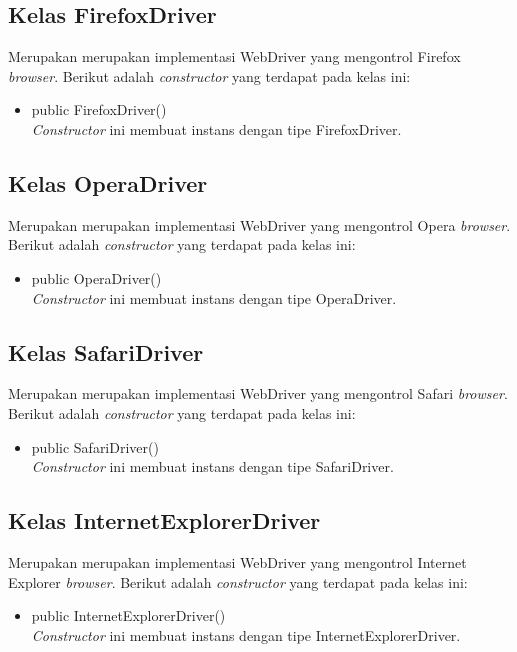 \subsection{Kelas FirefoxDriver}
\label{subsec:firefoxdriver}
Merupakan merupakan implementasi WebDriver yang mengontrol Firefox \textit{browser}. Berikut adalah \textit{constructor} yang terdapat pada kelas ini:
\begin{itemize}
\item public FirefoxDriver()\\
\textit{Constructor} ini membuat instans dengan tipe FirefoxDriver.
\end{itemize}

\subsection{Kelas OperaDriver}
\label{subsec:operadriver}
Merupakan merupakan implementasi WebDriver yang mengontrol Opera \textit{browser}. Berikut adalah \textit{constructor} yang terdapat pada kelas ini:
\begin{itemize}
\item public OperaDriver()\\
\textit{Constructor} ini membuat instans dengan tipe OperaDriver.
\end{itemize}

\subsection{Kelas SafariDriver}
\label{subsec:safaridriver}
Merupakan merupakan implementasi WebDriver yang mengontrol Safari \textit{browser}. Berikut adalah \textit{constructor} yang terdapat pada kelas ini:
\begin{itemize}
\item public SafariDriver()\\
\textit{Constructor} ini membuat instans dengan tipe SafariDriver.
\end{itemize}

\subsection{Kelas InternetExplorerDriver}
\label{subsec:internetexplorerdriver}
Merupakan merupakan implementasi WebDriver yang mengontrol Internet Explorer \textit{browser}. Berikut adalah \textit{constructor} yang terdapat pada kelas ini:
\begin{itemize}
\item public InternetExplorerDriver()\\
\textit{Constructor} ini membuat instans dengan tipe InternetExplorerDriver.
\end{itemize}

